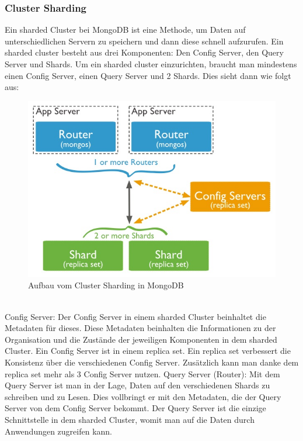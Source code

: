 \subsubsection{Cluster Sharding}
Ein sharded Cluster bei MongoDB ist eine Methode, um Daten auf unterschiedlichen Servern zu speichern und dann diese schnell aufzurufen. Ein sharded cluster besteht aus drei Komponenten: Den Config Server, den Query Server und Shards. Um ein sharded cluster einzurichten, braucht man mindestens einen Config Server, einen Query Server und 2 Shards. Dies sieht dann wie folgt aus:
\\
\begin{figure}
	\centering
 	\includegraphics[scale=1]{images/sharded-cluster-production-architecture.jpg} 
	\caption{Aufbau vom Cluster Sharding in MongoDB}
\end{figure}
\\
Config Server: Der Config Server in einem sharded Cluster beinhaltet die Metadaten für dieses. Diese Metadaten beinhalten die Informationen zu der Organisation und die Zustände der jeweiligen Komponenten in dem sharded Cluster.  Ein Config Server ist in einem replica set. Ein replica set verbessert die Konsistenz über die verschiedenen Config Server. Zusätzlich kann man danke dem replica set mehr als 3 Config Server nutzen.
Query Server (Router): Mit dem Query Server ist man in der Lage, Daten auf den verschiedenen Shards zu schreiben und zu Lesen. Dies vollbringt er mit den Metadaten, die der Query Server von dem Config Server bekommt. Der Query Server ist die einzige Schnittstelle in dem sharded Cluster, womit man auf die Daten durch Anwendungen zugreifen kann. 
\\
